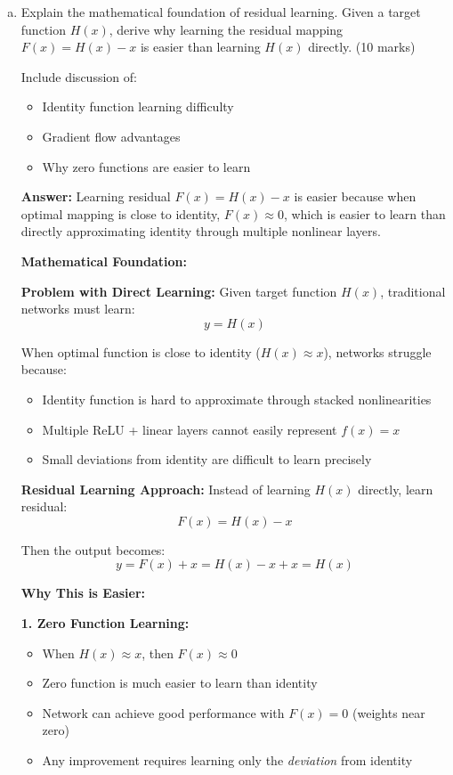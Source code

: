 \documentclass[12pt]{article}
\newcommand{\answer}[1]{{\color{answercolor}\textbf{Answer:} #1}}
\newcommand{\explanation}[1]{{\color{explanationcolor}#1}}
\begin{document}
\begin{enumerate}[(a)]
    \item Explain the mathematical foundation of residual learning. Given a target function $H(x)$, derive why learning the residual mapping $F(x) = H(x) - x$ is easier than learning $H(x)$ directly. \hfill (10 marks)
    
    Include discussion of:
    \begin{itemize}
        \item Identity function learning difficulty
        \item Gradient flow advantages
        \item Why zero functions are easier to learn
    \end{itemize}
    
    \answer{Learning residual $F(x) = H(x) - x$ is easier because when optimal mapping is close to identity, $F(x) \approx 0$, which is easier to learn than directly approximating identity through multiple nonlinear layers.}
    
    \explanation{
    \textbf{Mathematical Foundation:}
    
    \textbf{Problem with Direct Learning:}
    Given target function $H(x)$, traditional networks must learn:
    $$y = H(x)$$
    
    When optimal function is close to identity ($H(x) \approx x$), networks struggle because:
    \begin{itemize}
        \item Identity function is hard to approximate through stacked nonlinearities
        \item Multiple ReLU + linear layers cannot easily represent $f(x) = x$
        \item Small deviations from identity are difficult to learn precisely
    \end{itemize}
    
    \textbf{Residual Learning Approach:}
    Instead of learning $H(x)$ directly, learn residual:
    $$F(x) = H(x) - x$$
    
    Then the output becomes:
    $$y = F(x) + x = H(x) - x + x = H(x)$$
    
    \textbf{Why This is Easier:}
    
    \textbf{1. Zero Function Learning:}
    \begin{itemize}
        \item When $H(x) \approx x$, then $F(x) \approx 0$
        \item Zero function is much easier to learn than identity
        \item Network can achieve good performance with $F(x) = 0$ (weights near zero)
        \item Any improvement requires learning only the \textit{deviation} from identity
    \end{itemize}
    
}
\end{enumerate}
\end{document}
